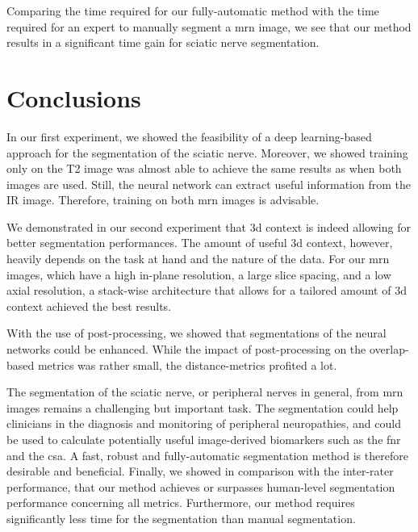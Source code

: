 Comparing the time required for our fully-automatic method with the time required for an expert to manually segment a \gls{mrn} image, we see that our method results in a significant time gain for sciatic nerve segmentation.

\section{Conclusions} \label{disc:conclusions}
In our first experiment, we showed the feasibility of a deep learning-based approach for the segmentation of the sciatic nerve. Moreover, we showed training only on the T2 image was almost able to achieve the same results as when both images are used. Still, the neural network can extract useful information from the IR image. Therefore, training on both \gls{mrn} images is advisable.

We demonstrated in our second experiment that \gls{3d} context is indeed allowing for better segmentation performances. The amount of useful \gls{3d} context, however, heavily depends on the task at hand and the nature of the data. For our \gls{mrn} images, which have a high in-plane resolution, a large slice spacing, and a low axial resolution, a stack-wise architecture that allows for a tailored amount of \gls{3d} context achieved the best results.

With the use of post-processing, we showed that segmentations of the neural networks could be enhanced. While the impact of post-processing on the overlap-based metrics was rather small, the distance-metrics profited a lot.

The segmentation of the sciatic nerve, or peripheral nerves in general, from \gls{mrn} images remains a challenging but important task. The segmentation could help clinicians in the diagnosis and monitoring of peripheral neuropathies, and could be used to calculate potentially useful image-derived biomarkers such as the \gls{fnr} and the \gls{csa}. A fast, robust and fully-automatic segmentation method is therefore desirable and beneficial. Finally, we showed in comparison with the inter-rater performance, that our method achieves or surpasses human-level segmentation performance concerning all metrics. Furthermore, our method requires significantly less time for the segmentation than manual segmentation.

\endinput